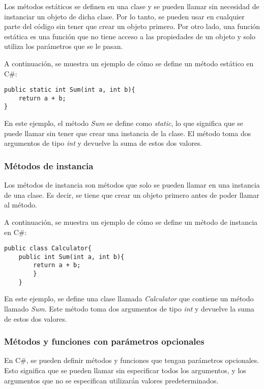 \documentclass[executivepaper]{article}
\begin{document}
Los métodos estáticos se definen en una clase y se pueden llamar sin necesidad de instanciar un objeto de dicha clase. Por lo tanto, se pueden usar en cualquier parte del código sin tener que crear un objeto primero. Por otro lado, una función estática es una función que no tiene acceso a las propiedades de un objeto y solo utiliza los parámetros que se le pasan.

A continuación, se muestra un ejemplo de cómo se define un método estático en C\#:

\begin{lstlisting}
public static int Sum(int a, int b){
    return a + b;
}
\end{lstlisting}

En este ejemplo, el método \emph{Sum} se define como \emph{static}, lo que significa que se puede llamar sin tener que crear una instancia de la clase. El método toma dos argumentos de tipo \emph{int} y devuelve la suma de estos dos valores.

\subsubsection*{Métodos de instancia}

Los métodos de instancia son métodos que solo se pueden llamar en una instancia de una clase. Es decir, se tiene que crear un objeto primero antes de poder llamar al método.

A continuación, se muestra un ejemplo de cómo se define un método de instancia en C\#:

\begin{lstlisting}
public class Calculator{
    public int Sum(int a, int b){
        return a + b;
        }
    }
\end{lstlisting}

En este ejemplo, se define una clase llamada \emph{Calculator} que contiene un método llamado \emph{Sum}. Este método toma dos argumentos de tipo \emph{int} y devuelve la suma de estos dos valores.

\subsubsection*{Métodos y funciones con parámetros opcionales}

En C\#, se pueden definir métodos y funciones que tengan parámetros opcionales. Esto significa que se pueden llamar sin especificar todos los argumentos, y los argumentos que no se especifican utilizarán valores predeterminados.
\end{document}
